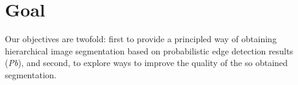\section{Goal}
Our objectives are  twofold:  first to provide a principled way of obtaining hierarchical image segmentation based on probabilistic edge detection results ({\it Pb}), and second, to explore ways to improve the quality of the so %
obtained segmentation.




